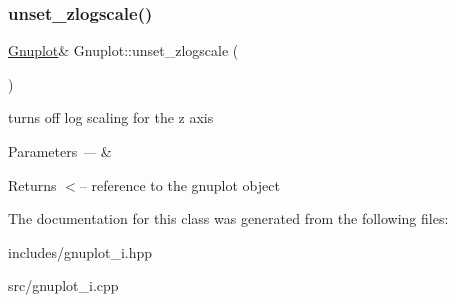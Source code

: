 \subsubsection{\texorpdfstring{unset\+\_\+zlogscale()}{unset\_zlogscale()}}
{\footnotesize\ttfamily \mbox{\hyperlink{class_gnuplot}{Gnuplot}}\& Gnuplot\+::unset\+\_\+zlogscale (\begin{DoxyParamCaption}{ }\end{DoxyParamCaption})\hspace{0.3cm}{\ttfamily [inline]}}

turns off log scaling for the z axis


\begin{DoxyParams}{Parameters}
{\em ---} & \\
\hline
\end{DoxyParams}
\begin{DoxyReturn}{Returns}
$<$-- reference to the gnuplot object 
\end{DoxyReturn}


The documentation for this class was generated from the following files\+:\begin{DoxyCompactItemize}
\item 
includes/gnuplot\+\_\+i.\+hpp\item 
src/gnuplot\+\_\+i.\+cpp\end{DoxyCompactItemize}
